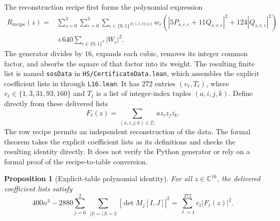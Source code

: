 \documentclass[11pt]{article}
\newtheorem{proposition}[theorem]{Proposition}
\theoremstyle{definition}
\theoremstyle{remark}
\newcommand{\C}{\mathbb C}
\newcommand{\conj}[1]{\overline{#1}}
\begin{document}
The reconstruction recipe first forms the polynomial expression
\begin{align*}
 R_{\mathrm{recipe}}(z)={}&
 \sum_{s=0}^3\sum_{r=0}^3\sum_{\epsilon\in\{0,1\}^{\{0,1,2,3\}\setminus\{s\}}}
 w_r\left(|5P_{s,r,\epsilon}+11Q_{s,r,\epsilon}|^2
             +124|Q_{s,r,\epsilon}|^2\right)
 \\
 &+640\sum_{\epsilon\in\{0,1\}^4}|W_\epsilon|^2.
\end{align*}
The generator divides by $16$, expands each cubic, removes its integer
common factor, and absorbs the square of that factor into its weight.
The resulting finite list is named \texttt{sosData} in
\texttt{HS/CertificateData.lean}, which assembles the explicit coefficient
lists in  through
\texttt{L16.lean}. It has 272 entries
$(v_\ell,T_\ell)$, where $v_\ell\in\{1,3,31,93,160\}$ and
$T_\ell$ is a list of integer-index tuples $(a,i,j,k)$.
Define directly from these delivered lists
\[
 F_\ell(z)=\sum_{(a,i,j,k)\in T_\ell}a z_i z_j\conj{z_k}.
\]
The row recipe permits an independent reconstruction of the data. The
formal theorem takes the explicit coefficient lists as its definitions
and checks the resulting identity directly. It does not verify the
Python generator or rely on a formal proof of the recipe-to-table
conversion.

\begin{samepage}
\begin{proposition}[Explicit-table polynomial identity]
\label{prop:certificate}
For all $z\in\C^{16}$, the delivered coefficient lists satisfy
\begin{equation}
 400n^3-2880
   \sum_{j=0}^2\sum_{\substack{|I|=|J|=3}}|\det M_j[I,J]|^2
 =\sum_{\ell=1}^{272}v_\ell|F_\ell(z)|^2.
 \label{eq:certificate}
\end{equation}
\end{proposition}
\end{samepage}
\end{document}
